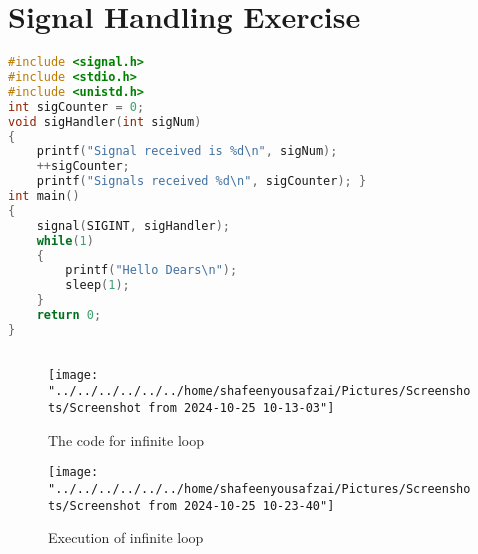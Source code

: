 \documentclass[12pt]{article}
\begin{document}
\section{Signal Handling Exercise}
\begin{lstlisting}[language=C, caption={Mini-Shell using execvp}]
#include <signal.h>
#include <stdio.h>
#include <unistd.h>
int sigCounter = 0;
void sigHandler(int sigNum)
{
	printf("Signal received is %d\n", sigNum);
	++sigCounter;
	printf("Signals received %d\n", sigCounter); }
int main()
{
	signal(SIGINT, sigHandler);
	while(1)
	{
		printf("Hello Dears\n");
		sleep(1);
	}
	return 0;
}	
	
\end{lstlisting}
\begin{figure}[H]
	\centering
	\texttt{[image: "../../../../../../home/shafeenyousafzai/Pictures/Screenshots/Screenshot from 2024-10-25 10-13-03"]}
	\caption{The code for infinite loop}
	\label{fig:screenshot-from-2024-10-25-10-13-03}
\end{figure}
\begin{figure}[H]
	\centering
	\texttt{[image: "../../../../../../home/shafeenyousafzai/Pictures/Screenshots/Screenshot from 2024-10-25 10-23-40"]}
	\caption{Execution of infinite loop}
	\label{fig:screenshot-from-2024-10-25-10-23-40}
\end{figure}
\end{document}
